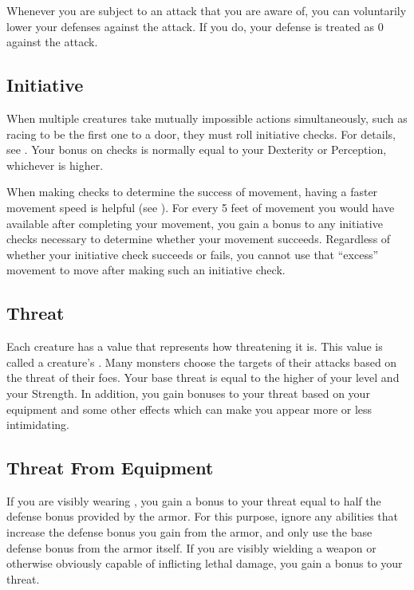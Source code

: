              Whenever you are subject to an attack that you are aware of, you can voluntarily lower your defenses against the attack.
            If you do, your defense is treated as 0 against the attack.

    \subsection{Initiative}\label{Initiative}
        When multiple creatures take mutually impossible actions simultaneously, such as racing to be the first one to a door, they must roll initiative checks.
        For details, see .
        Your bonus on  checks is normally equal to your Dexterity or Perception, whichever is higher.

        \label{Movement-Based Initiative}
        When making  checks to determine the success of movement, having a faster movement speed is helpful (see ).
        For every 5 feet of movement you would have available after completing your movement, you gain a  bonus to any initiative checks necessary to determine whether your movement succeeds.
        Regardless of whether your initiative check succeeds or fails, you cannot use that ``excess'' movement to move after making such an initiative check.

    \subsection{Threat}\label{Threat}
        Each creature has a value that represents how threatening it is.
        This value is called a creature's .
        Many monsters choose the targets of their attacks based on the threat of their foes.
        Your base threat is equal to the higher of your level and your Strength.
        In addition, you gain bonuses to your threat based on your equipment and some other effects which can make you appear more or less intimidating.

        \subsection{Threat From Equipment}
            If you are visibly wearing , you gain a bonus to your threat equal to half the defense bonus provided by the armor.
            For this purpose, ignore any abilities that increase the defense bonus you gain from the armor, and only use the base defense bonus from the armor itself.
            If you are visibly wielding a weapon or otherwise obviously capable of inflicting lethal damage, you gain a  bonus to your threat.

